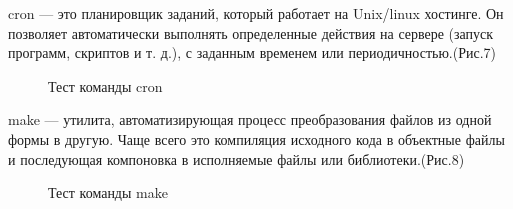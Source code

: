 \documentclass[a4paper,14pt]{extarticle}
\begin{document}
cron — это планировщик заданий, который работает на Unix/linux хостинге. Он позволяет автоматически выполнять определенные действия на сервере (запуск программ, скриптов и т. д.), с заданным временем или периодичностью.(Рис.7) 

\begin{figure}[h]
\caption{Тест команды cron}
\label{fig:image}
\end{figure}

make — утилита, автоматизирующая процесс преобразования файлов из одной формы в другую. Чаще всего это компиляция исходного кода в объектные файлы и последующая компоновка в исполняемые файлы или библиотеки.(Рис.8)

\begin{figure}[h]
\caption{Тест команды make}
\label{fig:image}
\end{figure}




%
%    
\end{document}
